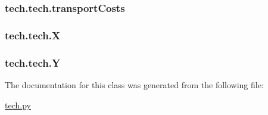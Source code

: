 \hypertarget{classtech_1_1tech_a728f1e576f7907d69f9f4b1490289782}{
\subsubsection[{transport\-Costs}]{\setlength{\rightskip}{0pt plus 5cm}tech.\-tech.\-transport\-Costs}}\label{classtech_1_1tech_a728f1e576f7907d69f9f4b1490289782}
\hypertarget{classtech_1_1tech_ad0c5a665f6d99e4c1f5e03b55483eb2d}{
\subsubsection[{X}]{\setlength{\rightskip}{0pt plus 5cm}tech.\-tech.\-X}}\label{classtech_1_1tech_ad0c5a665f6d99e4c1f5e03b55483eb2d}
\hypertarget{classtech_1_1tech_a9d56090b99261ae3e735d1f7afecca31}{
\subsubsection[{Y}]{\setlength{\rightskip}{0pt plus 5cm}tech.\-tech.\-Y}}\label{classtech_1_1tech_a9d56090b99261ae3e735d1f7afecca31}


The documentation for this class was generated from the following file\-:\begin{DoxyCompactItemize}
\item 
\hyperlink{tech_8py}{tech.\-py}\end{DoxyCompactItemize}
